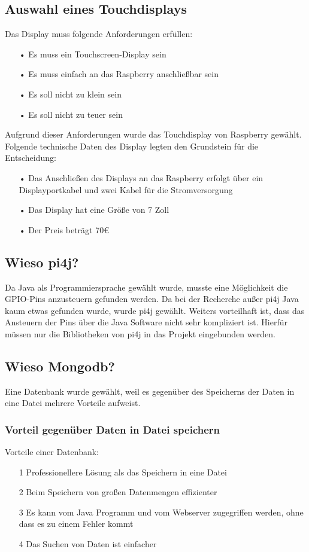 \subsection{Auswahl eines Touchdisplays}
Das Display muss folgende Anforderungen erfüllen:
\begin{itemize}
\item[•] Es muss ein Touchscreen-Display sein
\item[•] Es muss einfach an das Raspberry anschließbar sein
\item[•] Es soll nicht zu klein sein
\item[•] Es soll nicht zu teuer sein
\end{itemize}

Aufgrund dieser Anforderungen wurde das Touchdisplay von Raspberry gewählt.
\\ Folgende technische Daten des Display legten den Grundstein für die Entscheidung:
\begin{itemize}
\item[•] Das Anschließen des Displays an das Raspberry erfolgt über ein Displayportkabel und zwei Kabel für die Stromversorgung
\item[•] Das Display hat eine Größe von 7 Zoll
\item[•] Der Preis beträgt 70\euro{}
\end{itemize}

\subsection{Wieso pi4j?}
Da Java als Programmiersprache gewählt wurde, musste eine Möglichkeit die \ac{GPIO}-Pins anzusteuern gefunden werden.
Da bei der Recherche außer \ac{pi4j} Java kaum etwas gefunden wurde, wurde \ac{pi4j} gewählt. Weiters vorteilhaft ist, dass das Ansteuern der Pins über die Java Software nicht sehr kompliziert ist. Hierfür müssen nur die Bibliotheken von \ac{pi4j} in das Projekt eingebunden werden.

\subsection{Wieso Mongodb?}
Eine Datenbank wurde gewählt, weil es gegenüber des Speicherns der Daten in eine Datei mehrere Vorteile aufweist. 
\subsubsection{Vorteil gegenüber Daten in Datei speichern}
Vorteile einer Datenbank:
\begin{itemize}
\item[1] Professionellere Lösung als das Speichern in eine Datei
\item[2] Beim Speichern von großen Datenmengen effizienter
\item[3] Es kann vom Java Programm und vom Webserver zugegriffen werden, ohne dass es zu einem Fehler kommt
\item[4] Das Suchen von Daten ist einfacher
\end{itemize}
